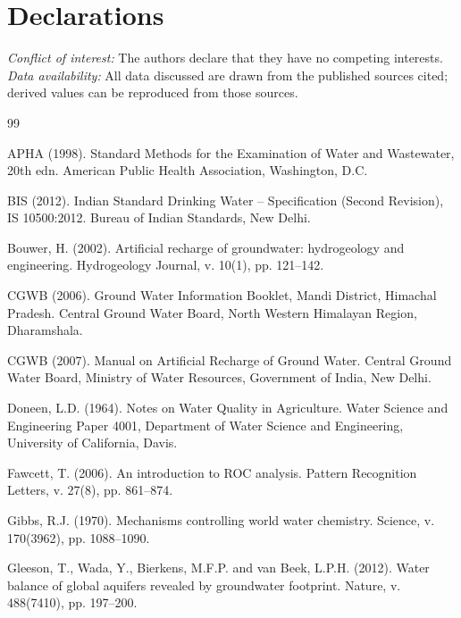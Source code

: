 \documentclass[10pt,a4paper,twocolumn]{article}
\begin{document}
\section{Declarations}
\noindent\textit{Conflict of interest:} The authors declare that they have no competing
interests.\\
\noindent\textit{Data availability:} All data discussed are drawn from the published sources
cited; derived values can be reproduced from those sources.

\begin{thebibliography}{99}
\setlength{\itemsep}{1pt}
\small

APHA (1998). Standard Methods for the Examination of Water and Wastewater, 20th edn. American
Public Health Association, Washington, D.C.

BIS (2012). Indian Standard Drinking Water -- Specification (Second Revision), IS 10500:2012.
Bureau of Indian Standards, New Delhi.

Bouwer, H. (2002). Artificial recharge of groundwater: hydrogeology and engineering.
Hydrogeology Journal, v. 10(1), pp. 121--142.

CGWB (2006). Ground Water Information Booklet, Mandi District, Himachal Pradesh. Central Ground
Water Board, North Western Himalayan Region, Dharamshala.

CGWB (2007). Manual on Artificial Recharge of Ground Water. Central Ground Water Board, Ministry
of Water Resources, Government of India, New Delhi.

Doneen, L.D. (1964). Notes on Water Quality in Agriculture. Water Science and Engineering Paper
4001, Department of Water Science and Engineering, University of California, Davis.

Fawcett, T. (2006). An introduction to ROC analysis. Pattern Recognition Letters, v. 27(8),
pp. 861--874.

Gibbs, R.J. (1970). Mechanisms controlling world water chemistry. Science, v. 170(3962),
pp. 1088--1090.

Gleeson, T., Wada, Y., Bierkens, M.F.P. and van Beek, L.P.H. (2012). Water balance of global
aquifers revealed by groundwater footprint. Nature, v. 488(7410), pp. 197--200.


\end{thebibliography}
\end{document}
